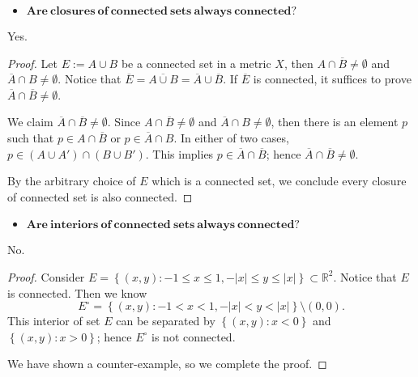 \begin{Exercise}
	\begin{itemize}
		\item $\mathbf{Are\ closures\ of\ connected\ sets\ always\ connected?}$
	\end{itemize}
	\begin{answer}
		Yes.
	\end{answer}
	\begin{proof}
		Let $E := A\cup B$ be a connected set in a metric $X$, then $A\cap\overline{B}\neq\emptyset$ and $\overline{A}\cap B\neq\emptyset$. Notice that $\overline{E} = \overline{A\cup B} = \overline{A}\cup\overline{B}$. If $\overline{E}$ is connected, it suffices to prove $\overline{A}\cap \overline{B}\neq\emptyset$.
		
		We claim $\overline{A}\cap\overline{B}\neq\emptyset$. Since $A\cap\overline{B}\neq\emptyset$ and $\overline{A}\cap B\neq\emptyset$, then there is an element $p$ such that $p\in A\cap\overline{B}$ or $p\in \overline{A}\cap B$. In either of two cases, $p\in (A\cup A')\cap(B\cup B')$. This implies $p\in \overline{A}\cap\overline{B}$; hence $\overline{A}\cap\overline{B}\neq\emptyset$.
		
		By the arbitrary choice of $E$ which is a connected set, we conclude every closure of connected set is also connected.
	\end{proof}
	
	\begin{itemize}
		\item $\mathbf{Are\ interiors\ of\ connected\ sets\ always\ connected?}$
	\end{itemize}
	\begin{answer}
		No.
	\end{answer}
	\begin{proof}
		Consider $E = \left\{(x,y):-1\leq x \leq 1, -|x|\leq y \leq |x|\right\} \subset \mathbb{R}^2$. Notice that $E$ is connected. Then we know
		$$
		E^{\circ} = \left\{(x,y):-1<x<1, -|x|<y<|x|\right\}\setminus(0,0).
		$$
		This interior of set $E$ can be separated by $\left\{(x,y):x<0\right\}$ and $\left\{(x,y):x>0\right\}$; hence $E^{\circ}$ is not connected.
		
		We have shown a counter-example, so we complete the proof.
	\end{proof}
\end{Exercise}